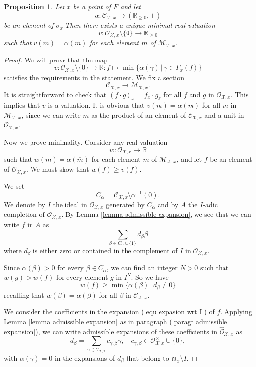 \documentclass{amsart}%
\numberwithin{equation}{subsection}
\theoremstyle{plain2}
\newtheorem{prop}[equation]{Proposition}
\theoremstyle{definition2}
\theoremstyle{stepstyle}
\theoremstyle{point}
\theoremstyle{subpoint}
\newcommand{\R}{\ensuremath{\mathbb{R}}}
\newcommand{\cX}{\ensuremath{\mathscr{X}}}
\newcommand{\caC}{\ensuremath{\mathcal{C}}}
\newcommand{\caO}{\ensuremath{\mathcal{O}}}
\renewcommand{\R}{\ensuremath{\mathbb{R}}}
\begin{document}
\begin{prop}\label{prop-val}
Let $x$ be a point of $F$ and let $$\alpha:\mathcal{C}_{\cX,x}\to (\R_{\geqslant 0},+)$$ be an element of $\sigma_x$.Then there exists a unique minimal real valuation $$v:\mathcal{O}_{\cX,x} \setminus \{0\}\to \R_{\geqslant 0}$$ such that $v(m)=\alpha(\overline{m})$ for each element $m$ of $\mathcal{M}_{\cX,x}$.
\end{prop}
\begin{proof}
We will prove that the map
\begin{equation}\label{eq:val}
v:\mathcal{O}_{\cX,x} \setminus \{0\}\to \R:f\mapsto
\min\{\alpha(\gamma)\,|\,\gamma\in \Gamma_x(f)\}\end{equation}
satisfies the requirements in the statement. We fix a section $$\mathcal{C}_{\cX,x}\to \mathcal{M}_{\cX,x}.$$
It is straightforward to check that $(f\cdot g)_x=f_x\cdot g_x$ for all $f$ and $g$ in $\mathcal{O}_{\cX,x}$. This implies that $v$ is a valuation. It is obvious that
$v(m)=\alpha(\overline{m})$ for all $m$ in $\mathcal{M}_{\cX,x}$, since we can write $m$ as the product of an element of $\mathcal{C}_{\cX,x}$ and a unit in $\mathcal{O}_{\cX,x}$.

Now we prove minimality. Consider any real valuation $$w:\mathcal{O}_{\cX,x}\to \R$$ such that $w(m)=\alpha(\overline{m})$ for each element $m$ of
$\mathcal{M}_{\cX,x}$, and let $f$ be an element of
$\mathcal{O}_{\cX,x}$. We must show that $w(f)\geqslant v(f)$.

We set $$C_{\alpha}=\mathcal{C}_{\cX,x}\setminus \alpha^{-1}(0).$$ We denote by $I$ the ideal in $\mathcal{O}_{\cX,x}$ generated by $C_{\alpha}$ and by $A$ the $I$-adic completion of $\mathcal{O}_{\cX,x}$. By Lemma \ref{lemma admissible expansion}, we see that we can write $f$ in $A$ as \begin{equation} \label{equ expasion wrt I}
\sum_{\beta \in C_{\alpha}\cup\{1\}}d_\beta \beta
\end{equation} where $d_\beta$ is either zero or contained in the complement of $I$ in $\mathcal{O}_{\cX,x}$.

Since $\alpha(\beta)>0$ for every $\beta\in C_{\alpha}$, we can find an integer $N>0$ such that $w(g)>w(f)$ for every element $g$ in  $I^N$. So we have $$w(f)\geqslant \min \{\alpha(\beta)\,|\,d_\beta \neq 0\}$$ recalling that $w(\beta)=\alpha(\beta)$ for all $\beta$ in $\mathcal{C}_{\cX,x}$.

We consider the coefficients in the expansion (\ref{equ expasion wrt I}) of $f$. Applying Lemma \ref{lemma admissible expansion} as in paragraph (\ref{paragr admissible expansion}), we can write admissible expansions of these coefficients in $\widehat{\mathcal{O}}_{\cX,x}$ as $$d_\beta = \sum_{\gamma \in \caC_{\cX,x}}c_{\gamma, \beta} \gamma, \quad c_{\gamma, \beta} \in \caO_{\cX,x}^\times \cup \{0\},$$ with $\alpha(\gamma)=0$ in the expansions of $d_\beta$ that belong to $\mathfrak{m}_x \setminus I$. 


\end{proof}
\end{document}
